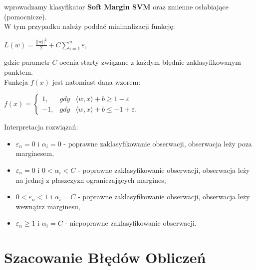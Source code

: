 \documentclass[12pt,a4paper]{report}
\begin{document}
wprowadzamy klasyfikator \textbf{Soft Margin SVM} oraz zmienne osłabiające (pomocnicze).
\\W tym przypadku należy poddać minimalizacji funkcję:
\begin{center}
$L(w) = \frac{||w||^2}{2} + C \sum_{i=1}^n \varepsilon$,
\end{center}
gdzie parametr $C$ ocenia starty związane z każdym błędnie zaklasyfikowanym punktem.
\\Funkcja $f(x)$ jest natomiast dana wzorem:
\begin{center}
$f(x) = 
\left\{\begin{array}{lll}
1, & gdy &   \langle w,x \rangle + b \geq 1 - \varepsilon\\
-1, &   gdy &   \langle w,x \rangle + b \leq -1 + \varepsilon.
\end{array} \right.$
\end{center}
Interpretacja rozwiązań:
\begin{itemize}
\item $\varepsilon_n =0$ i $\alpha_i =0$ - poprawne zaklasyfikowanie obserwacji, obserwacja leży poza marginesem,
\item $\varepsilon_n =0$ i $0<\alpha_i <C$ - poprawne zaklasyfikowanie obserwacji, obserwacja leży na jednej z płaszczyzn ograniczających margines,
\item $0<\varepsilon_n <1$ i $\alpha_i =C$ - poprawne zaklasyfikowanie obserwacji, obserwacja leży wewnątrz marginesu,
\item $\varepsilon_n \geq 1$ i $\alpha_i =C$ - niepoprawne zaklasyfikowanie obserwacji.
\end{itemize}

\section{Szacowanie Błędów Obliczeń}
\end{document}
